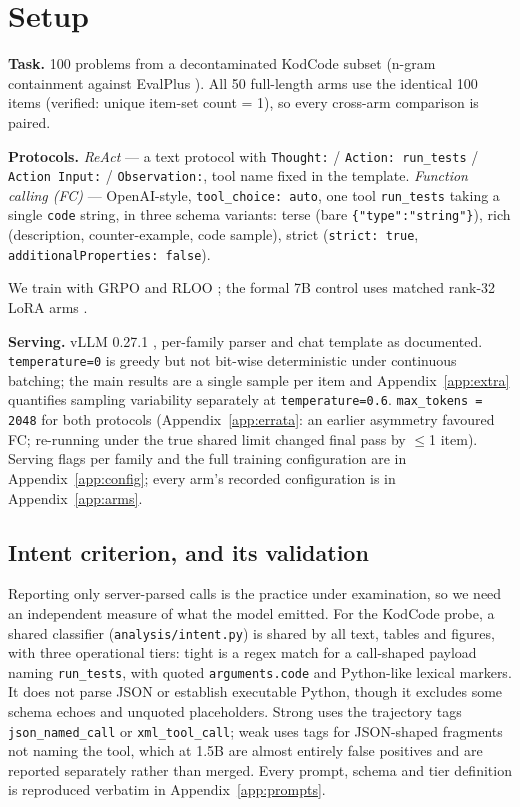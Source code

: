 \section{Setup}
\label{sec:setup}

\textbf{Task.} 100 problems from a decontaminated KodCode \citep{kodcode2025} subset (n-gram containment against
EvalPlus \citep{liu2023evalplus}). All 50 full-length arms use the identical 100 items (verified: unique
item-set count = 1), so every cross-arm comparison is paired.

\textbf{Protocols.} \emph{ReAct} --- a text protocol with \texttt{Thought:} /
\texttt{Action: run\_tests} / \texttt{Action Input:} / \texttt{Observation:}, tool name fixed
in the template. \emph{Function calling (FC)} --- OpenAI-style, \texttt{tool\_choice: auto},
one tool \texttt{run\_tests} taking a single \texttt{code} string, in three schema variants:
terse (bare \texttt{\{"type":"string"\}}), rich (description,
counter-example, code sample), strict (\texttt{strict: true},
\texttt{additionalProperties: false}).

We train with GRPO \citep{shao2024deepseekmath} and RLOO \citep{ahmadian2024rloo}; the formal 7B
control uses matched rank-32 LoRA arms \citep{hu2022lora}.

\textbf{Serving.} vLLM 0.27.1 \citep{kwon2023vllm,vllm_toolcalling_docs}, per-family parser
and chat template as documented. \texttt{temperature=0} is greedy but not bit-wise
deterministic under continuous batching; the main results are a single sample per item and
Appendix~\ref{app:extra} quantifies sampling variability separately at
\texttt{temperature=0.6}. \texttt{max\_tokens = 2048} for both protocols
(Appendix~\ref{app:errata}: an earlier asymmetry favoured FC; re-running under the true
shared limit changed final pass by $\leq$1 item). Serving flags per family and the full
training configuration are in Appendix~\ref{app:config}; every arm's recorded configuration
is in Appendix~\ref{app:arms}.

\subsection{Intent criterion, and its validation}
\label{sec:intent}
\label{sec:humanval}

Reporting only server-parsed calls is the practice under examination, so we need an
independent measure of what the model emitted. For the KodCode probe, a shared classifier
(\texttt{analysis/intent.py}) is shared by all text, tables and figures, with three
operational tiers: tight is a regex match for a call-shaped payload naming
\texttt{run\_tests}, with quoted \texttt{arguments.code} and Python-like lexical markers.
It does not parse JSON or establish executable Python, though it excludes some schema echoes
and unquoted placeholders. Strong uses the trajectory tags \texttt{json\_named\_call} or
\texttt{xml\_tool\_call}; weak uses tags for JSON-shaped fragments not
naming the tool, which at 1.5B are almost entirely false positives and are reported
separately rather than merged. Every prompt, schema and tier definition is reproduced
verbatim in Appendix~\ref{app:prompts}.

